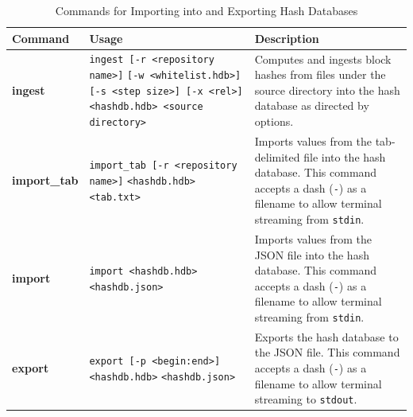 \documentclass[11pt,fleqn]{article} %
\begin{document}
\begin{table}[!ht]
\centering
\caption{Commands for Importing into and Exporting Hash Databases}
\label{tab:importExport}
\begin{tabular}{|p{2.5 cm}|p{7 cm}|p{4 cm}|}
\hline \hline
\textbf{Command} & \textbf{Usage} & \textbf{Description} \\
\hline
\textbf{ingest} & \verb+ingest [-r <repository name>]+ \verb+[-w <whitelist.hdb>]+ \verb+[-s <step size>] [-x <rel>]+ \verb+ <hashdb.hdb> <source directory>+& Computes and ingests block hashes from files under the source directory into the hash database as directed by options.\\
\hline
\textbf{import\_tab} & \verb+import_tab [-r <repository name>]+ \verb+<hashdb.hdb>+ \verb+<tab.txt>+& Imports values from the tab-delimited file into the hash database. This command accepts a dash (\verb+-+) as a filename to allow terminal streaming from \verb+stdin+.\\
\hline
\textbf{import} & \verb+import <hashdb.hdb>+ \verb+<hashdb.json>+& Imports values from the JSON file into the hash database. This command accepts a dash (\verb+-+) as a filename to allow terminal streaming from \verb+stdin+.\\
\hline
\textbf{export} & \verb+export [-p <begin:end>] <hashdb.hdb>+ \verb+<hashdb.json>+& Exports the hash database to the JSON file. This command accepts a dash (\verb+-+) as a filename to allow terminal streaming to \verb+stdout+.\\
\hline
\end{tabular}
\end{table}
\end{document}
